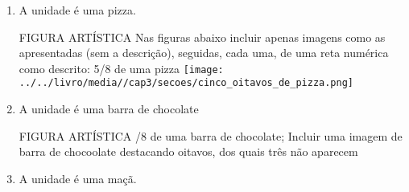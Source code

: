 \begin{enumerate} [\quad a)] %
  \item     A unidade é uma pizza. 

\begin{imagem*}[breakable]{}{}   FIGURA ARTÍSTICA   \mbox{} \newline Nas figuras abaixo incluir apenas imagens como as apresentadas (sem a descrição), seguidas, cada uma, de uma reta numérica como descrito: 5/8 de uma pizza   \mbox{} \newline        \texttt{[image: ../../livro/media//cap3/secoes/cinco\_oitavos\_de\_pizza.png]} \end{imagem*}

\begin{center}
\end{center}

\item     A unidade é uma barra de chocolate 

\begin{imagem*}[breakable]{}{}   FIGURA ARTÍSTICA   \mbox{} /8 de uma barra de chocolate;   \mbox{} \newline    Incluir uma imagem de barra de chocoolate destacando oitavos, dos quais três não aparecem \end{imagem*}
\begin{center}
\end{center}

\item     A unidade é uma maçã. 


\end{enumerate}
